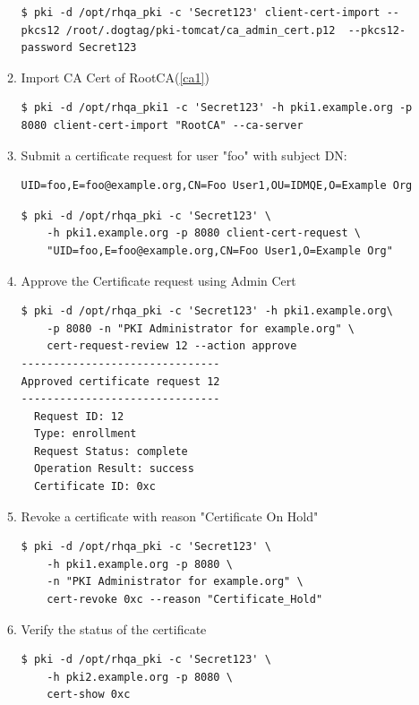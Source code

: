 \documentclass[a4paper]{article}
\begin{document}
\begin{enumerate}[label*=\arabic*.]
\begin{enumerate}[label*=\arabic*.]
\begin{lstlisting}[style=bashInputStyle]
$ pki -d /opt/rhqa_pki -c 'Secret123' client-cert-import --pkcs12 /root/.dogtag/pki-tomcat/ca_admin_cert.p12  --pkcs12-password Secret123                                    
                    \end{lstlisting}
                \item \label{pki3} Import CA Cert of RootCA(\ref{ca1})
                    \begin{lstlisting}[style=bashInputStyle]
$ pki -d /opt/rhqa_pki1 -c 'Secret123' -h pki1.example.org -p 8080 client-cert-import "RootCA" --ca-server                                    
                    \end{lstlisting}
                \item \label{pki4} Submit a certificate request for user "foo" with subject DN:
                    \begin{lstlisting}
UID=foo,E=foo@example.org,CN=Foo User1,OU=IDMQE,O=Example Org
                    \end{lstlisting}
                    \begin{lstlisting}[style=bashInputStyle]
$ pki -d /opt/rhqa_pki -c 'Secret123' \
    -h pki1.example.org -p 8080 client-cert-request \
    "UID=foo,E=foo@example.org,CN=Foo User1,O=Example Org" 
                    \end{lstlisting}
                \item \label{pki5} Approve the Certificate request using Admin Cert
                    \begin{lstlisting}[style=bashInputStyle]
$ pki -d /opt/rhqa_pki -c 'Secret123' -h pki1.example.org\
    -p 8080 -n "PKI Administrator for example.org" \
    cert-request-review 12 --action approve
-------------------------------
Approved certificate request 12
-------------------------------
  Request ID: 12
  Type: enrollment
  Request Status: complete
  Operation Result: success
  Certificate ID: 0xc
                    \end{lstlisting}
                \item Revoke a certificate with reason "Certificate On Hold"
                    \begin{lstlisting}[style=bashInputStyle]
$ pki -d /opt/rhqa_pki -c 'Secret123' \
    -h pki1.example.org -p 8080 \
    -n "PKI Administrator for example.org" \
    cert-revoke 0xc --reason "Certificate_Hold"
                    \end{lstlisting}
            \item Verify the status of the certificate
                \begin{lstlisting}[style=bashInputStyle]
$ pki -d /opt/rhqa_pki -c 'Secret123' \
    -h pki2.example.org -p 8080 \
    cert-show 0xc
                \end{lstlisting}
        \end{enumerate}
    \end{enumerate}
\end{document}

